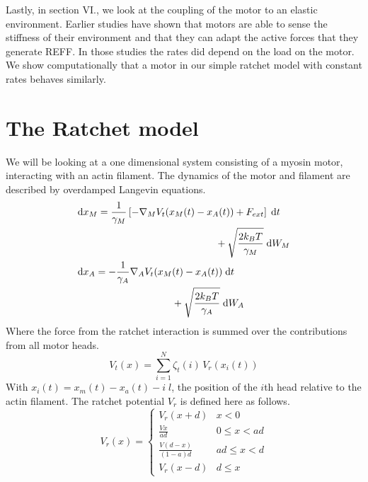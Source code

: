 \documentclass[aps,pre,twocolumn,showpacs,showkeys,a4paper]{revtex4}
\newcommand{\rmd}{{\mathrm d}}
\begin{document}
Lastly, in section VI., we look at the coupling of the motor to an elastic environment. %
Earlier studies have shown that  motors are able to sense the stiffness of their environment and that they can adapt the active forces that they generate REFF. %
In those studies the rates did depend on the load on the motor. We show computationally that a motor in our simple ratchet model with constant rates behaves similarly.


\section{The Ratchet model}
\label{sec:ratchet}
We will be looking at a one dimensional system consisting of a myosin motor, interacting with an actin filament. The dynamics of the motor and filament are described by overdamped Langevin equations. 
\begin{align}
&\begin{multlined}[b][.35\textwidth]
\rmd x_M = 
\frac{1}{\gamma_M} \left[ - \nabla_M V_t(x_M(t) - x_A(t)) + F_{ext} \right] \; \rmd t \\ 
+ \sqrt{ \frac{2 k_B T}{\gamma_M} } \; \rmd W_M 
\end{multlined}
\label{eom_M} \\
&\begin{multlined}[b][.35\textwidth]
\rmd x_A = 
- \frac{1}{\gamma_A} \nabla_A V_t(x_M(t) - x_A(t)) \; \rmd t \\
+ \sqrt{ \frac{2 k_B T}{\gamma_A} } \; \rmd W_A
\end{multlined}
\label{eom_A}
\end{align}
Where the force from the ratchet interaction is summed over the contributions from all motor heads.
\begin{equation}
V_t(x) = \sum_{i=1}^{N} \zeta_t(i) \, V_{r} (x_i(t))
\end{equation}
With $x_i(t) = x_{m}(t)-x_{a}(t) - i\;l$, the position of the $i$th head relative to the actin filament.
The ratchet potential $V_r$ is defined here as follows.
\begin{equation}
V_{r}(x) =  \begin{cases}
        V_r(x+d) & x < 0 \\[1ex] 
        \displaystyle \frac{ V x }{ a d } & 0 \leq x < a d \\[2ex]
        \displaystyle \frac{ V (d-x) }{ (1-a) d } & a d \leq x < d \\[2ex]
        V_r(x-d) & d \leq x  
   \end{cases}
   \label{rat_pot}
\end{equation}
\end{document}
